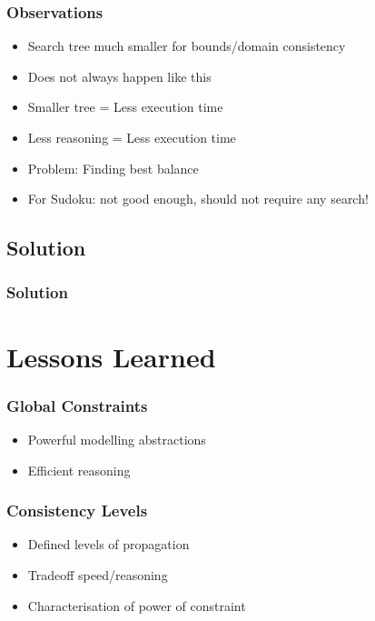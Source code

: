 \documentclass{beamer}
\begin{document}
\begin{frame}
\frametitle{Observations}
\begin{itemize}
\item Search tree much smaller for bounds/domain consistency
\item Does not always happen like this
\item Smaller tree = Less execution time
\item Less reasoning = Less execution time
\item Problem: Finding best balance
\item For Sudoku: not good enough, should not require any search!
\end{itemize}
\end{frame}

\subsection{Solution}
\begin{frame}
\frametitle{Solution}

\end{frame}


\section{Lessons Learned}

\begin{frame}
\frametitle{Global Constraints}
\begin{itemize}
\item Powerful modelling abstractions
\item Efficient reasoning
\end{itemize}
\end{frame}


\begin{frame}
\frametitle{Consistency Levels}
\begin{itemize}
\item Defined levels of propagation
\item Tradeoff speed/reasoning
\item Characterisation of power of constraint
\end{itemize}
\end{frame}
\end{document}
